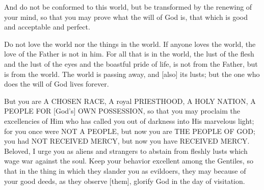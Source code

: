 \vspace{2\baselineskip}

\begin{scripture}[Romans 12:2]
    And do not be conformed to this world, but be transformed by the renewing of your mind, so that you may prove what the will of God is, that which is good and acceptable and perfect.
\end{scripture}

\vspace{2\baselineskip}

\begin{scripture}[1 John 2:15-17]
    Do not love the world nor the things in the world. If anyone loves the world, the love of the Father is not in him.
    For all that is in the world, the lust of the flesh and the lust of the eyes and the boastful pride of life, is not from the Father, but is from the world.
    The world is passing away, and [also] its lusts; but the one who does the will of God lives forever.
\end{scripture}

\vspace{2\baselineskip}

\begin{scripture}[1 Peter 2:9-12]
    But you are A CHOSEN RACE, A royal PRIESTHOOD, A HOLY NATION, A PEOPLE FOR [God's] OWN POSSESSION, so that you may proclaim the excellencies of Him who has called you out of darkness into His marvelous light;
    for you once were NOT A PEOPLE, but now you are THE PEOPLE OF GOD; you had NOT RECEIVED MERCY, but now you have RECEIVED MERCY.
    Beloved, I urge you as aliens and strangers to abstain from fleshly lusts which wage war against the soul.
    Keep your behavior excellent among the Gentiles, so that in the thing in which they slander you as evildoers, they may because of your good deeds, as they observe [them], glorify God in the day of visitation.
\end{scripture}

\vspace{2\baselineskip}
